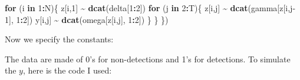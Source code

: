 \documentclass[
  12pt,
]{krantz}
\newenvironment{Shaded}{\begin{snugshade}}{\end{snugshade}}
\newcommand{\AttributeTok}[1]{\textcolor[rgb]{0.13,0.29,0.53}{#1}}
\newcommand{\ControlFlowTok}[1]{\textcolor[rgb]{0.13,0.29,0.53}{\textbf{#1}}}
\newcommand{\DecValTok}[1]{\textcolor[rgb]{0.00,0.00,0.81}{#1}}
\newcommand{\DocumentationTok}[1]{\textcolor[rgb]{0.56,0.35,0.01}{\textbf{\textit{#1}}}}
\newcommand{\FunctionTok}[1]{\textcolor[rgb]{0.13,0.29,0.53}{\textbf{#1}}}
\newcommand{\NormalTok}[1]{#1}
\newcommand{\OtherTok}[1]{\textcolor[rgb]{0.56,0.35,0.01}{#1}}
\newcommand{\SpecialCharTok}[1]{\textcolor[rgb]{0.81,0.36,0.00}{\textbf{#1}}}
\begin{document}
\begin{Shaded}
\begin{Highlighting}[]
  \ControlFlowTok{for}\NormalTok{ (i }\ControlFlowTok{in} \DecValTok{1}\SpecialCharTok{:}\NormalTok{N)\{}
\NormalTok{    z[i,}\DecValTok{1}\NormalTok{] }\SpecialCharTok{\textasciitilde{}} \FunctionTok{dcat}\NormalTok{(delta[}\DecValTok{1}\SpecialCharTok{:}\DecValTok{2}\NormalTok{])}
    \ControlFlowTok{for}\NormalTok{ (j }\ControlFlowTok{in} \DecValTok{2}\SpecialCharTok{:}\NormalTok{T)\{}
\NormalTok{      z[i,j] }\SpecialCharTok{\textasciitilde{}} \FunctionTok{dcat}\NormalTok{(gamma[z[i,j}\DecValTok{{-}1}\NormalTok{], }\DecValTok{1}\SpecialCharTok{:}\DecValTok{2}\NormalTok{])}
\NormalTok{      y[i,j] }\SpecialCharTok{\textasciitilde{}} \FunctionTok{dcat}\NormalTok{(omega[z[i,j], }\DecValTok{1}\SpecialCharTok{:}\DecValTok{2}\NormalTok{])}
\NormalTok{    \}}
\NormalTok{  \}}
\NormalTok{\})}
\end{Highlighting}
\end{Shaded}

Now we specify the constants:

\begin{Shaded}
\end{Shaded}

The data are made of 0's for non-detections and 1's for detections. To simulate the \(y\), here is the code I used:
\end{document}
